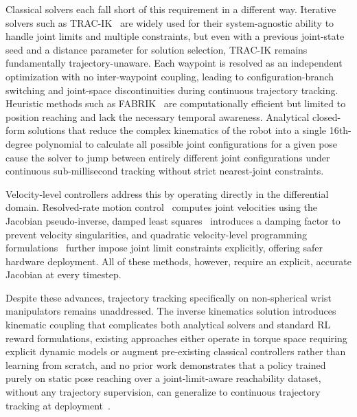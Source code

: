 Classical solvers each fall short of this requirement in a different way. Iterative solvers such as
TRAC-IK~\citep{beeson2015trac} are widely used for their system-agnostic ability to handle joint
limits and multiple constraints, but even with a previous joint-state seed and a distance parameter
for solution selection, TRAC-IK remains fundamentally trajectory-unaware. Each waypoint is resolved
as an independent optimization with no inter-waypoint coupling, leading to configuration-branch
switching and joint-space discontinuities during continuous trajectory tracking. Heuristic methods
such as FABRIK~\citep{aristidou2011fabrik} are computationally efficient but limited to position
reaching and lack the necessary temporal awareness. Analytical closed-form solutions that reduce the
complex kinematics of the robot into a single 16th-degree polynomial to calculate all possible joint
configurations for a given pose~\citep{zohour2021kinova} cause the solver to jump between entirely
different joint configurations under continuous sub-millisecond tracking without strict nearest-joint
constraints.

Velocity-level controllers address this by operating directly in the differential domain.
Resolved-rate motion control~\citep{whitney1969resolved} computes joint velocities using the
Jacobian pseudo-inverse, damped least squares~\citep{wampler1986manipulator,chiaverini1994review}
introduces a damping factor to prevent velocity singularities, and quadratic velocity-level
programming formulations~\citep{zhang2013variable} further impose joint limit constraints explicitly,
offering safer hardware deployment. All of these methods, however, require an explicit, accurate
Jacobian at every timestep.

Despite these advances, trajectory tracking specifically on non-spherical wrist manipulators remains
unaddressed. The inverse kinematics solution introduces kinematic coupling that complicates both
analytical solvers and standard RL reward formulations, existing approaches either operate in torque
space requiring explicit dynamic models or augment pre-existing classical controllers rather than
learning from scratch, and no prior work demonstrates that a policy trained purely on static pose
reaching over a joint-limit-aware reachability dataset, without any trajectory supervision, can
generalize to continuous trajectory tracking at deployment~\citep{sk2025diktracking}.

